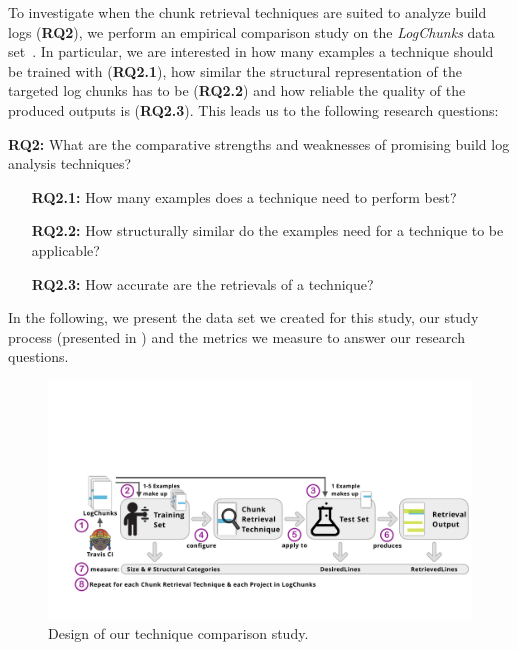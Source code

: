 \label{sec:study}

To investigate when the chunk retrieval techniques are suited to
analyze build logs (\textbf{RQ2}), we perform an empirical comparison
study on the \emph{LogChunks} data set~\cite{brandt2020logchunks}.
In particular, we are interested in how many examples a technique
should be trained with (\textbf{RQ2.1}),
how similar the structural representation of the targeted log chunks
has to be (\textbf{RQ2.2}) and how reliable the quality of the
produced outputs is (\textbf{RQ2.3}). This leads us to the following research questions:

\begin{simplebox}[minipage boxed title*=-1.5cm,
attach boxed title to top center={yshift=-6mm}]
{\textbf{RQ2:} What are the comparative strengths and weaknesses
of promising build log analysis techniques?}
\begin{itemize}[leftmargin=1.2cm]
  \item[\textbf{RQ2.1:}] How many examples does a technique need to
  perform best?
  \item[\textbf{RQ2.2:}] How structurally similar do the examples
  need for a technique to be applicable?
  \item[\textbf{RQ2.3:}] How accurate are the retrievals of a technique?
\end{itemize}
\end{simplebox}

In the following, we present the data set we created for this study,
our study process (presented in ) and the metrics
we measure to answer our research questions.

\begin{figure}[tb]
	\centering
	\includegraphics[width=\textwidth, trim={1.6cm 1.6cm 0.2cm 5.6cm},
  clip]{img/study.pdf}
	\caption{Design of our technique comparison study.}
	\label{fig:study}
\end{figure}


